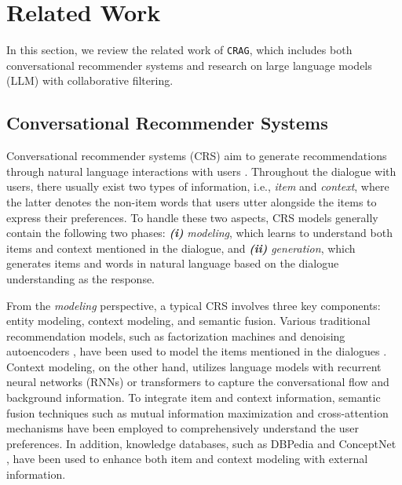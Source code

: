\section{Related Work}
\label{sec:rel_work}

In this section, we review the related work of \texttt{CRAG}, which includes both conversational recommender systems and research on large language models (LLM) with collaborative filtering.

\subsection{Conversational Recommender Systems}

Conversational recommender systems (CRS) aim to generate recommendations through natural language interactions with users \cite{jannach2021survey,gao2021advances}. Throughout the dialogue with users, there usually exist two types of information, i.e., \textit{item} and \textit{context}, where the latter denotes the non-item words that users utter alongside the items to express their preferences. To handle these two aspects, CRS models generally contain the following two phases: \textbf{\textit{(i)}} \textit{modeling}, which learns to understand both items and context mentioned in the dialogue, and \textbf{\textit{(ii)}} \textit{generation}, which generates items and words in natural language based on the dialogue understanding as the response. 

From the \textit{modeling} perspective, a typical CRS involves three key components: entity modeling, context modeling, and semantic fusion. Various traditional recommendation models, such as factorization machines \citep{rendle2010factorization} and denoising autoencoders \citep{vincent2008extracting}, have been used to model the items mentioned in the dialogues \citep{li2018towards, chen2019towards}. Context modeling, on the other hand, utilizes language models with recurrent neural networks (RNNs) \citep{chung2014empirical} or transformers \citep{vaswani2017attention, ham2020end} to capture the conversational flow and background information. To integrate item and context information, semantic fusion techniques such as mutual information maximization \citep{belghazi2018mutual} and cross-attention mechanisms \citep{vaswani2017attention} have been employed \citep{zhou2020improving, wang2022towards} to comprehensively understand the user preferences. In addition, knowledge databases, such as DBPedia \cite{auer2007dbpedia} and ConceptNet \cite{speer2017conceptnet}, have been used to enhance both item and context modeling with external information. 

